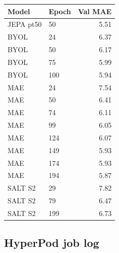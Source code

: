 \documentclass{article}
\begin{document}
\begin{center}
\begin{tabular}{llr}
\toprule
Model & Epoch & Val MAE \\
\midrule
JEPA pt50    & 50 & 5.51 \\
BYOL & 24 & 6.37 \\
BYOL & 50 & 6.17 \\
BYOL & 75 & 5.99 \\
BYOL & 100 & 5.94 \\
MAE & 24 & 7.54 \\
MAE & 50 & 6.41 \\
MAE & 74 & 6.11 \\
MAE & 99 & 6.05 \\
MAE & 124 & 6.07 \\
MAE & 149 & 5.93 \\
MAE & 174 & 5.93 \\
MAE & 194 & 5.87 \\
SALT S2 & 29 & 7.82 \\
SALT S2 & 79 & 6.47 \\
SALT S2 & 199 & 6.73 \\
\bottomrule
\end{tabular}
\end{center}

\subsection{HyperPod job log}
\end{document}
